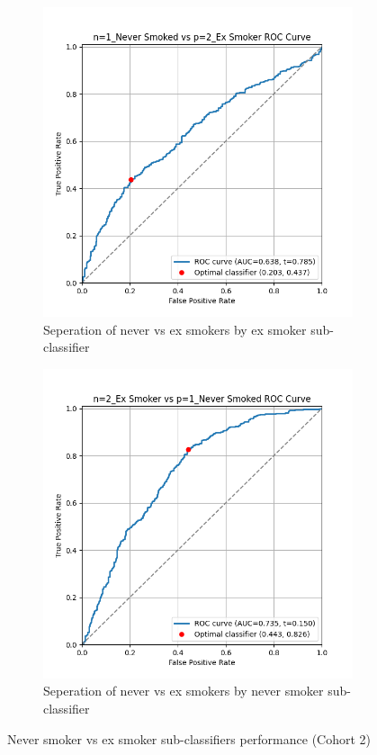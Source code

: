 \documentclass{article}
\begin{document}
\begin{figure}
    \begin{subfigure}{0.48\textwidth}
        \centering
        \includegraphics[width=\linewidth]{cohort2_1v2_roc.png}
        \caption{Seperation of never vs ex smokers by ex smoker sub-classifier}
    \end{subfigure}
    \hfill
    \begin{subfigure}{0.48\textwidth}
        \centering
        \includegraphics[width=\linewidth]{cohort2_2v1_roc.png}
        \caption{Seperation of never vs ex smokers by never smoker sub-classifier}
    \end{subfigure}
    \caption{Never smoker vs ex smoker sub-classifiers performance (Cohort 2)}
\end{figure}
\end{document}
